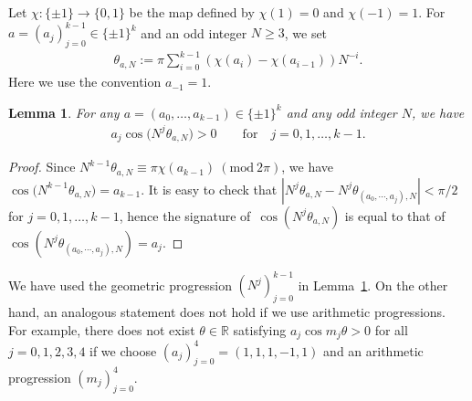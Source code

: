 \documentclass[pdftex]{sigma}
\numberwithin{equation}{section}
\newtheorem{Lemma}[Theorem]{Lemma}
\begin{document}
Let $\chi\colon\{\pm 1\} \rightarrow \{0,1\}$ be
the map defined by $\chi(1) = 0$ and $\chi(-1) = 1$.
For $a = (a_j)_{j=0}^{k-1} \in \{\pm1\}^{k}$ and an odd integer $N\geq 3$,
we set
\begin{align*}%
\theta_{a,N} := \pi\sum_{i=0}^{k-1} (\chi(a_i) - \chi(a_{i-1}))N^{-i}.
\end{align*}
Here we use the convention $a_{-1}=1$.
\begin{Lemma}\label{sekoi}
For any $a=(a_{0},\ldots,a_{k-1})\in \{\pm1\}^{k}$ and any odd integer $N$,
we have
\begin{gather*}
a_j\cos\big(N^{j}\theta_{a,N}\big) > 0 \qquad \text{for}\quad j=0,1,\ldots,k-1.
\end{gather*}
\end{Lemma}

\begin{proof}
Since
$N^{k-1}\theta_{a,N} \equiv \pi \chi(a_{k-1}) \ (\mathrm{mod}\ 2\pi)$,
we have $\cos \big(N^{k-1} \theta_{a,N}\big) = a_{k-1}$.
It is easy to check that
$|N^{j} \theta_{a,N} - N^{j} \theta_{(a_0,\cdots,a_j),N}| < \pi/2$ for $j=0,1,\ldots,k-1$,
hence the signature of~$\cos (N^{j} \theta_{a,N})$ is equal to that of
$\cos (N^{j} \theta_{(a_0,\cdots,a_j),N}) = a_j$.
\end{proof}

\begin{Remark}
We have used the geometric progression $(N^{j})_{j=0}^{k-1}$ in Lemma~\ref{sekoi}.
On the other hand, an analogous statement does not hold if
we use arithmetic progressions. For example,
there does not exist $\theta \in \mathbb{R}$
satisfying $a_j\cos m_j\theta > 0$ for all $j=0,1,2,3,4$
if we choose $(a_j)_{j=0}^{4}=(1,1,1,-1,1)$ and
an arithmetic progression $(m_j)_{j=0}^{4}$.
\end{Remark}
\end{document}

